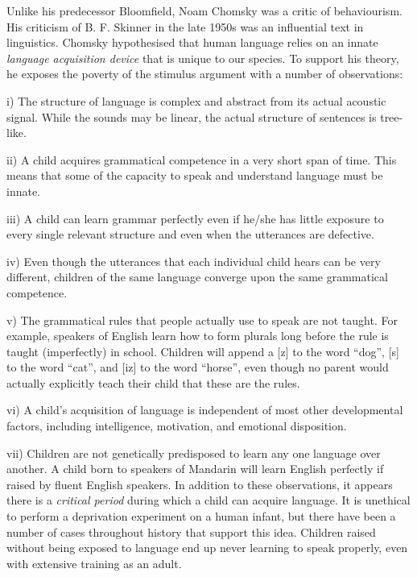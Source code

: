 Unlike his predecessor Bloomfield, Noam Chomsky was a critic of behaviourism. His criticism of B. F. Skinner in the late 1950s was an influential text in linguistics. Chomsky hypothesised that human language relies on an innate {\it language acquisition device} that is unique to our species. To support his theory, he exposes the poverty of the stimulus argument with a number of observations:
\medskip
\item{i)} The structure of language is complex and abstract from its actual acoustic signal. While the sounds may be linear, the actual structure of sentences is tree-like.
\smallskip
\item{ii)} A child acquires grammatical competence in a very short span of time. This means that some of the capacity to speak and understand language must be innate.
\smallskip
\item{iii)} A child can learn grammar perfectly even if he/she has little exposure to every single relevant structure and even when the utterances are defective.
\smallskip
\item{iv)} Even though the utterances that each individual child hears can be very different, children of the same language converge upon the same grammatical competence.
\smallskip
\item{v)} The grammatical rules that people actually use to speak are not taught. For example, speakers of English learn how to form plurals long before the rule is taught (imperfectly) in school. Children will append a [z] to the word ``dog'', [s] to the word ``cat'', and [iz] to the word ``horse'', even though no parent would actually explicitly teach their child that these are the rules.
\smallskip
\item{vi)} A child's acquisition of language is independent of most other developmental factors, including intelligence, motivation, and emotional disposition.
\smallskip
\item{vii)} Children are not genetically predisposed to learn any one language over another. A child born to speakers of Mandarin will learn English perfectly if raised by fluent English speakers.
\medskip
In addition to these observations, it appears there is a {\it critical period} during which a child can acquire language. It is unethical to perform a deprivation experiment on a human infant, but there have been a number of cases throughout history that support this idea. Children raised without being exposed to language end up never learning to speak properly, even with extensive training as an adult.

